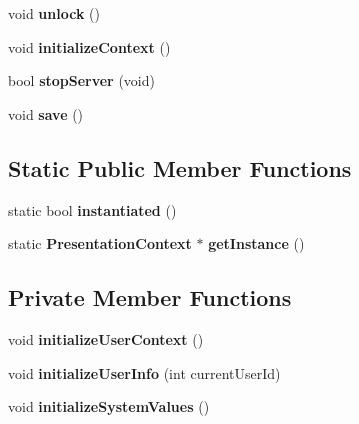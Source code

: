\begin{CompactItemize}
\item 
void {\bf unlock} ()\label{classbr_1_1pucrio_1_1telemidia_1_1ginga_1_1ncl_1_1adaptation_1_1context_1_1PresentationContext_9278be8203e1c42e2619179882ae4403}

\item 
void {\bf initializeContext} ()\label{classbr_1_1pucrio_1_1telemidia_1_1ginga_1_1ncl_1_1adaptation_1_1context_1_1PresentationContext_4fe7b0a6b4f50e6a49112b3ab31aa082}

\item 
bool {\bf stopServer} (void)\label{classbr_1_1pucrio_1_1telemidia_1_1ginga_1_1ncl_1_1adaptation_1_1context_1_1PresentationContext_83c02cb6fc97c574eb90925d76aaa120}

\item 
void \textbf{save} ()\label{classbr_1_1pucrio_1_1telemidia_1_1ginga_1_1ncl_1_1adaptation_1_1context_1_1PresentationContext_ae2c382151ef7c9aa913361172b30db6}

\end{CompactItemize}
\subsection*{Static Public Member Functions}
\begin{CompactItemize}
\item 
static bool \textbf{instantiated} ()\label{classbr_1_1pucrio_1_1telemidia_1_1ginga_1_1ncl_1_1adaptation_1_1context_1_1PresentationContext_23023134f588cb20c21c131c6f1c9bd8}

\item 
static {\bf PresentationContext} $\ast$ \textbf{getInstance} ()\label{classbr_1_1pucrio_1_1telemidia_1_1ginga_1_1ncl_1_1adaptation_1_1context_1_1PresentationContext_7411a9b58754a3fe228c513dc4be5d2d}

\end{CompactItemize}
\subsection*{Private Member Functions}
\begin{CompactItemize}
\item 
void \textbf{initializeUserContext} ()\label{classbr_1_1pucrio_1_1telemidia_1_1ginga_1_1ncl_1_1adaptation_1_1context_1_1PresentationContext_3bd7c62e0f2c4d2aad42a5f48e2ff6d4}

\item 
void \textbf{initializeUserInfo} (int currentUserId)\label{classbr_1_1pucrio_1_1telemidia_1_1ginga_1_1ncl_1_1adaptation_1_1context_1_1PresentationContext_ea89f7162315327cede367360bdd621d}

\item 
void \textbf{initializeSystemValues} ()\label{classbr_1_1pucrio_1_1telemidia_1_1ginga_1_1ncl_1_1adaptation_1_1context_1_1PresentationContext_c5ef12ffc93971706043c371f0ac6f45}

\end{CompactItemize}
